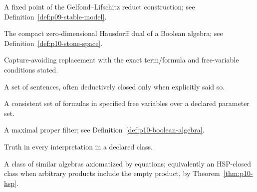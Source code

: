 \begin{description}[style=nextline,leftmargin=0pt]
\item[stable model] A fixed point of the Gelfond--Lifschitz reduct construction;
see Definition~\ref{def:p09-stable-model}.
\item[Stone space] The compact zero-dimensional Hausdorff dual of a Boolean
algebra; see Definition~\ref{def:p10-stone-space}.
\item[substitution] Capture-avoiding replacement with the exact term/formula
and free-variable conditions stated.
\item[theory] A set of sentences, often deductively closed only when explicitly
said so.
\item[type] A consistent set of formulas in specified free variables over a
declared parameter set.
\item[ultrafilter] A maximal proper filter; see Definition~\ref{def:p10-boolean-algebra}.
\item[validity] Truth in every interpretation in a declared class.
\item[variety] A class of similar algebras axiomatized by equations;
equivalently an HSP-closed class when arbitrary products include the empty
product, by Theorem~\ref{thm:p10-hsp}.
\end{description}
